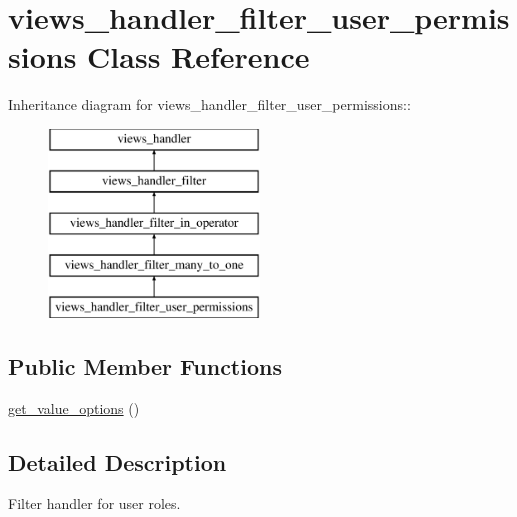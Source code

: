 \hypertarget{classviews__handler__filter__user__permissions}{
\section{views\_\-handler\_\-filter\_\-user\_\-permissions Class Reference}
\label{classviews__handler__filter__user__permissions}
}
Inheritance diagram for views\_\-handler\_\-filter\_\-user\_\-permissions::\begin{figure}[H]
\begin{center}
\leavevmode
\includegraphics[height=5cm]{classviews__handler__filter__user__permissions}
\end{center}
\end{figure}
\subsection*{Public Member Functions}
\begin{DoxyCompactItemize}
\item 
\hyperlink{classviews__handler__filter__user__permissions_a29db286bd8769cd996e3c5f2a02b0f36}{get\_\-value\_\-options} ()
\end{DoxyCompactItemize}


\subsection{Detailed Description}
Filter handler for user roles. 

